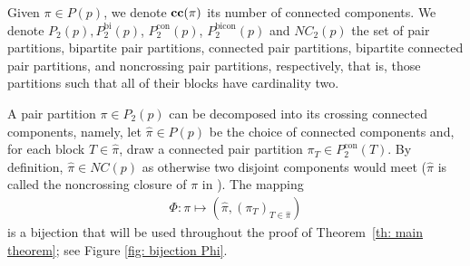 \documentclass[12pt,reqno]{amsart}
\theoremstyle{plain}
\newcommand{\1}{\mathbf{1}}
\newcommand{\ccblocks}{\operatorname{\bf cc}}
\begin{document}
Given $\pi \in P(p)$, we denote $\ccblocks(\pi)$ its number of connected components. We denote $P_2(p), P_2^{\operatorname{bi}}(p)$, $P_2^{\operatorname{con}}(p)$, $P_2^{\operatorname{bicon}}(p)$ and $NC_2(p)$ the set of pair partitions, bipartite pair partitions, connected pair partitions, bipartite connected pair partitions, and noncrossing pair partitions, respectively, that is, those partitions such that all of their blocks have cardinality two.


A pair partition $\pi \in P_2(p)$ can be decomposed into its crossing connected components, namely, let $\hat{\pi} \in P(p)$ be the choice of connected components and, for each block $T \in \hat{\pi}$, draw a connected pair partition $\pi_T \in P_2^{\operatorname{con}}(T)$. By definition, $\hat{\pi} \in NC(p)$ as otherwise two disjoint components would meet ($\hat{\pi}$ is called the noncrossing closure of $\pi$ in \cite{L2002}). The mapping 
\begin{align}\label{equation: mapping pi connected components}
    \Phi:\pi \mapsto (\hat{\pi},(\pi_T)_{T \in \hat{\pi}})
\end{align} 
is a bijection that will be used throughout the proof of Theorem~\ref{th: main theorem}; see Figure \ref{fig: bijection Phi}.
\end{document}
